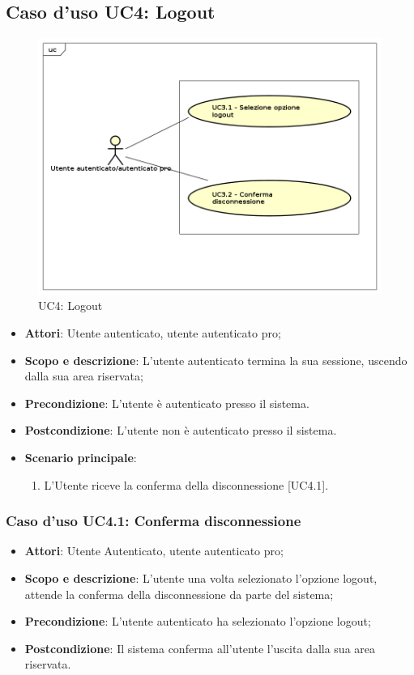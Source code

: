 \subsection{Caso d'uso UC4: Logout}
	\label{UC4}
	\begin{figure}[h]
		\centering
			\includegraphics[scale=0.5,keepaspectratio]{UML/UC4.png}
		\caption{UC4: Logout}
	\end{figure}
	\FloatBarrier
	\begin{itemize}
		\item
			\textbf{Attori}: Utente autenticato, utente autenticato pro;
		\item		
			\textbf{Scopo e descrizione}: L'utente autenticato termina la sua sessione, uscendo dalla sua area riservata;
		\item
			\textbf{Precondizione}: L'utente è autenticato presso il sistema.
		\item
			\textbf{Postcondizione}: L'utente non è autenticato presso il sistema. 
		\item
			\textbf{Scenario principale}:
	       		\begin{enumerate}
					\item
					L'Utente riceve la conferma della disconnessione [UC4.1].
	 			\end{enumerate}
	\end{itemize}

\subsubsection{Caso d'uso UC4.1: Conferma disconnessione}
	\begin{itemize}
		\item
			\textbf{Attori}: Utente Autenticato, utente autenticato pro;
		\item
			\textbf{Scopo e descrizione}: L'utente una volta selezionato l'opzione logout, attende la conferma della disconnessione da parte del sistema;
 		\item
			\textbf{Precondizione}: L'utente autenticato ha selezionato l'opzione logout;
		\item
			\textbf{Postcondizione}: Il sistema conferma all'utente l'uscita dalla sua area riservata.
	\end{itemize}		
	